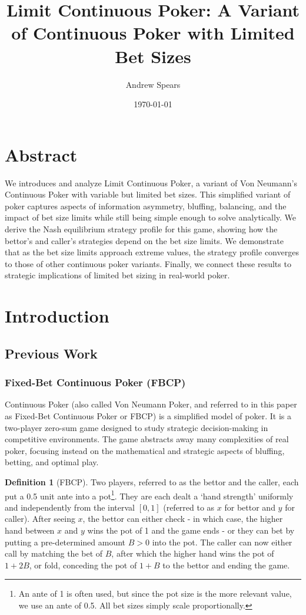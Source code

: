 \documentclass[a4paper,12pt]{article}
\title{Limit Continuous Poker: A Variant of Continuous Poker with Limited Bet Sizes}
\author{Andrew Spears}
\date{\today}
\theoremstyle{plain}
\theoremstyle{definition}
\newtheorem{definition}{Definition}[section]
\begin{document}
\maketitle

\section{Abstract}
We introduces and analyze Limit Continuous Poker, a variant of Von Neumann's Continuous Poker with variable but limited bet sizes. This simplified variant of poker captures aspects of information asymmetry, bluffing, balancing, and the impact of bet size limits while still being simple enough to solve analytically. We derive the Nash equilibrium strategy profile for this game, showing how the bettor's and caller's strategies depend on the bet size limits. We demonstrate that as the bet size limits approach extreme values, the strategy profile converges to those of other continuous poker variants. Finally, we connect these results to strategic implications of limited bet sizing in real-world poker.

\section{Introduction}


\subsection{Previous Work}

\subsubsection{Fixed-Bet Continuous Poker (FBCP)}

Continuous Poker (also called Von Neumann Poker, and referred to in this paper as Fixed-Bet Continuous Poker or FBCP) is a simplified model of poker. It is a two-player zero-sum game designed to study strategic decision-making in competitive environments. The game abstracts away many complexities of real poker, focusing instead on the mathematical and strategic aspects of bluffing, betting, and optimal play.

\begin{definition}[FBCP]
Two players, referred to as the bettor and the caller, each put a 0.5 unit ante into a pot\footnote{An ante of 1 is often used, but since the pot size is the more relevant value, we use an ante of 0.5. All bet sizes simply scale proportionally.}. They are each dealt a `hand strength' uniformly and independently from the interval $[0, 1]$ (referred to as $x$ for bettor and $y$ for caller). After seeing $x$, the bettor can either check - in which case, the higher hand between $x$ and $y$ wins the pot of 1 and the game ends - or they can bet by putting a pre-determined amount $B > 0$ into the pot. The caller can now either call by matching the bet of $B$, after which the higher hand wins the pot of $1+2B$, or fold, conceding the pot of $1+B$ to the bettor and ending the game.
\end{definition}
\end{document}
